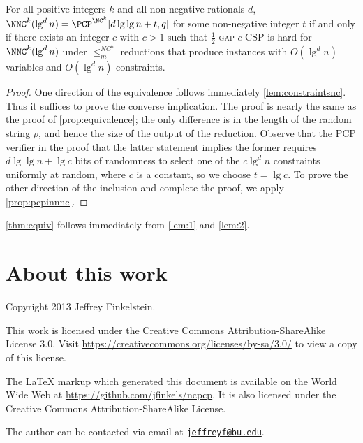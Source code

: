 \documentclass{article}
\newcommand{\email}[1]{\href{mailto:#1}{\nolinkurl{#1}}}
\begin{document}
\begin{lemma}\label{lem:2}
  For all positive integers $k$ and all non-negative rationals $d$, $\NNC^k(\lg^d n) = \PCP^{\NC^k}[d \lg \lg n + t, q]$ for some non-negative integer $t$ if and only if there exists an integer $c$ with $c > 1$ such that \textsc{$\frac{1}{2}$-gap $c$-CSP} is hard for $\NNC^k(\lg^d n)$ under $\leq_m^{NC^k}$ reductions that produce instances with $O(\lg^d n)$ variables and $O(\lg^d n)$ constraints.
\end{lemma}
\begin{proof}
  One direction of the equivalence follows immediately \autoref{lem:constraintsnc}.
  Thus it suffices to prove the converse implication.
  The proof is nearly the same as the proof of \autoref{prop:equivalence}; the only difference is in the length of the random string $\rho$, and hence the size of the output of the reduction.
  Observe that the PCP verifier in the proof that the latter statement implies the former requires $d \lg \lg n + \lg c$ bits of randomness to select one of the $c \lg^d n$ constraints uniformly at random, where $c$ is a constant, so we choose $t = \lg c$.
  To prove the other direction of the inclusion and complete the proof, we apply \autoref{prop:pcpinnnc}.
\end{proof}

\autoref{thm:equiv} follows immediately from \autoref{lem:1} and \autoref{lem:2}.

\section{About this work}

Copyright 2013 Jef{}frey Finkelstein.

This work is licensed under the Creative Commons Attribution-ShareAlike License 3.0.
Visit \mbox{\url{https://creativecommons.org/licenses/by-sa/3.0/}} to view a copy of this license.

The \LaTeX{} markup which generated this document is available on the World Wide Web at \mbox{\url{https://github.com/jfinkels/ncpcp}}.
It is also licensed under the Creative Commons Attribution-ShareAlike License.

The author can be contacted via email at \email{jeffreyf@bu.edu}.



\end{document}
